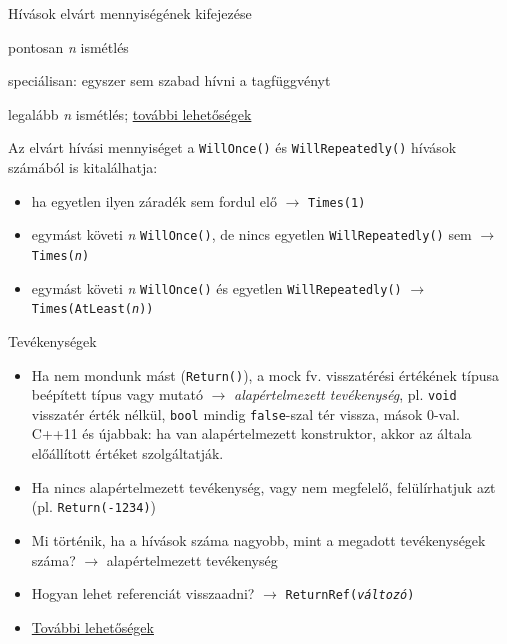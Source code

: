 \documentclass[usenames,dvipsnames,aspectratio=169]{beamer}
\newcommand{\hiv}[1]{{\color{hivatkozasszin}#1}}
\begin{document}
\begin{frame}
    Hívások elvárt mennyiségének kifejezése
    \begin{description}[mm]
        \item[\texttt{Times(\emph{n})}] pontosan \emph{n} ismétlés
        \item[\texttt{Times(0)}] speciálisan: egyszer sem szabad hívni a tagfüggvényt
        \item[\texttt{Times(AtLeast(\emph{n}))}] legalább \emph{n} ismétlés; \hiv{\href{https://google.github.io/googletest/reference/mocking.html\#EXPECT\_CALL.Times}{további lehetőségek}}
    \end{description}
    Az elvárt hívási mennyiséget a \texttt{WillOnce()} és \texttt{WillRepeatedly()} hívások számából is kitalálhatja:
    \begin{itemize}
        \item ha egyetlen ilyen záradék sem fordul elő $\to$ \texttt{Times(1)}
        \item egymást követi \emph{n} \texttt{WillOnce()}, de nincs egyetlen \texttt{WillRepeatedly()} sem $\to$ \texttt{Times(\emph{n})}
        \item egymást követi \emph{n} \texttt{WillOnce()} és egyetlen \texttt{WillRepeatedly()} $\to$ \texttt{Times(AtLeast(\emph{n}))}
    \end{itemize}
\end{frame}

\begin{frame}
    Tevékenységek
    \begin{itemize}
        \item Ha nem mondunk mást (\texttt{Return()}), a mock fv. visszatérési értékének típusa beépített típus vagy mutató $\to$ \emph{alapértelmezett tevékenység}, 
        pl. \texttt{void} visszatér érték nélkül, \texttt{bool} mindig \texttt{false}-szal tér vissza, mások 0-val.\\
        C++11 és újabbak: ha van alapértelmezett konstruktor, akkor az általa előállított értéket szolgáltatják.
        \item Ha nincs alapértelmezett tevékenység, vagy nem megfelelő, felülírhatjuk azt (pl. \texttt{Return(-1234)})
        \item Mi történik, ha a hívások száma nagyobb, mint a megadott tevékenységek száma? $\to$ alapértelmezett tevékenység
        \item Hogyan lehet referenciát visszaadni? $\to$ \texttt{ReturnRef(\emph{változó})}
        \item \hiv{\href{https://google.github.io/googletest/gmock\_cook\_book.html\#using-actions}{További lehetőségek}}
    \end{itemize}
\end{frame}
\end{document}

